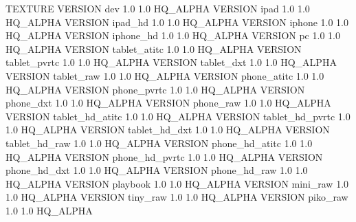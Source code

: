 TEXTURE
{
	VERSION dev				1.0 1.0		HQ_ALPHA
	VERSION ipad			1.0 1.0 	HQ_ALPHA
	VERSION ipad_hd			1.0 1.0 	HQ_ALPHA
	VERSION iphone 			1.0 1.0 	HQ_ALPHA
	VERSION iphone_hd		1.0 1.0		HQ_ALPHA
	VERSION pc 				1.0 1.0 	HQ_ALPHA
	VERSION tablet_atitc	1.0	1.0		HQ_ALPHA
	VERSION tablet_pvrtc	1.0	1.0		HQ_ALPHA
	VERSION tablet_dxt		1.0	1.0		HQ_ALPHA
	VERSION tablet_raw		1.0	1.0		HQ_ALPHA
	VERSION phone_atitc		1.0	1.0		HQ_ALPHA
	VERSION phone_pvrtc		1.0	1.0		HQ_ALPHA
	VERSION phone_dxt		1.0	1.0		HQ_ALPHA
	VERSION phone_raw		1.0	1.0		HQ_ALPHA
	VERSION tablet_hd_atitc	1.0	1.0		HQ_ALPHA
	VERSION tablet_hd_pvrtc	1.0	1.0		HQ_ALPHA
	VERSION tablet_hd_dxt	1.0	1.0		HQ_ALPHA
	VERSION tablet_hd_raw	1.0	1.0		HQ_ALPHA
	VERSION phone_hd_atitc	1.0	1.0		HQ_ALPHA
	VERSION phone_hd_pvrtc	1.0	1.0		HQ_ALPHA
	VERSION phone_hd_dxt	1.0	1.0		HQ_ALPHA
	VERSION phone_hd_raw	1.0	1.0		HQ_ALPHA
	VERSION playbook		1.0 1.0 	HQ_ALPHA
	VERSION mini_raw		1.0 1.0		HQ_ALPHA
	VERSION tiny_raw		1.0 1.0		HQ_ALPHA
	VERSION piko_raw		1.0 1.0		HQ_ALPHA
}
